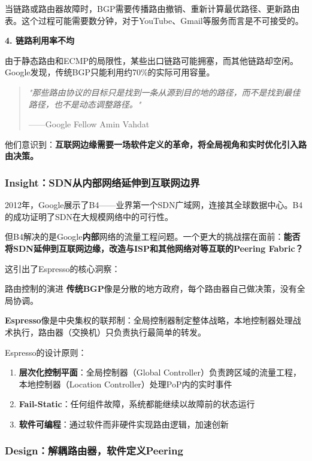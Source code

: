 当链路或路由器故障时，BGP需要传播路由撤销、重新计算最优路径、更新路由表。这个过程可能需要数分钟，对于YouTube、Gmail等服务而言是不可接受的。

\textbf{4. 链路利用率不均}

由于静态路由和ECMP的局限性，某些出口链路可能拥塞，而其他链路却空闲。Google发现，传统BGP只能利用约70\%的实际可用容量。

\begin{quote}
\textit{"那些路由协议的目标只是找到一条从源到目的地的路径，而不是找到最佳路径，也不是动态调整路径。"}

——Google Fellow Amin Vahdat
\end{quote}

他们意识到：\textbf{互联网边缘需要一场软件定义的革命，将全局视角和实时优化引入路由决策。}

\subsubsection{Insight：SDN从内部网络延伸到互联网边界}

2012年，Google展示了B4——业界第一个SDN广域网，连接其全球数据中心。B4的成功证明了SDN在大规模网络中的可行性。

但B4解决的是Google\textbf{内部}网络的流量工程问题。一个更大的挑战摆在面前：\textbf{能否将SDN延伸到互联网边缘，改造与ISP和其他网络对等互联的Peering Fabric？}

这引出了Espresso的核心洞察：

\begin{analogy}{路由控制的演进}
\textbf{传统BGP}像是分散的地方政府，每个路由器自己做决策，没有全局协调。

\textbf{Espresso}像是中央集权的联邦制：全局控制器制定整体战略，本地控制器处理战术执行，路由器（交换机）只负责执行最简单的转发。
\end{analogy}

Espresso的设计原则：
\begin{enumerate}
    \item \textbf{层次化控制平面}：全局控制器（Global Controller）负责跨区域的流量工程，本地控制器（Location Controller）处理PoP内的实时事件
    \item \textbf{Fail-Static}：任何组件故障，系统都能继续以故障前的状态运行
    \item \textbf{软件可编程}：通过软件而非硬件实现路由逻辑，加速创新
\end{enumerate}

\subsubsection{Design：解耦路由器，软件定义Peering}

